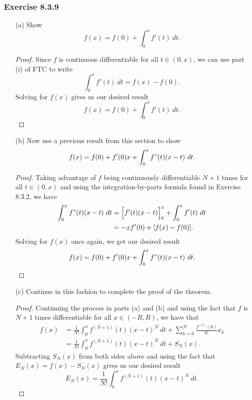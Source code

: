 \subsubsection{Exercise 8.3.9} 
\begin{enumerate}
    \item[(a)] Show 
        \[  f(x) = f(0) + \int_{ 0 }^{ x }  f'(t) \  dt. \]
        \begin{proof}
            Since \( f  \) is continuous differentiable for all  \( t \in (0,x) \), we can use part (i) of FTC to write 
        \[  \int_{ 0 }^{ x } f'(t)  \ dt =  f(x) - f(0). \] Solving for \( f(x)  \) gives us our desired result 
        \[ f(x) = f(0) + \int_{ 0 }^{ x }  f'(t) \ dt. \]
        \end{proof}
    \item[(b)] Now use a previous result from this section to show 
        \[  f(x) = f(0) + f'(0) x + \int_{ 0 }^{ x }  f"(t)(x-t) \  dt. \]
        \begin{proof}
            Taking advantage of \( f  \) being continuously differentiable \( N+1  \) times for all \(  t \in (0,x) \) and using the integration-by-parts formula found in Exercise 8.3.2, we have 
            \begin{align*}  \int_{ 0 }^{ x }  f"(t) (x -t ) \  dt &= \Big[ f'(t) (x-t) \Big]_{0}^{x} + \int_{ 0 }^{ x }  f'(t) \  dt \\
            &= -x f'(0) + [ f(x) - f(0)].  
            \end{align*}
            Solving for \( f(x)  \) once again, we get our desired result
        \[  f(x) = f(0) + f'(0) x + \int_{ 0 }^{ x }  f"(t)(x-t) \  dt. \]
        \end{proof}
    \item[(c)] Continue in this fashion to complete the proof of the theorem.
        \begin{proof} 
        Continuing the process in parts (a) and (b) and using the fact that \( f  \) is \( N+1  \) times differentiable for all \( x \in (-R ,R ) \), we have that
        \begin{align*}  f(x) &= \frac{ 1 }{ N! }  \int_{ 0 }^{ x  } f^{(N+1)}(t) (x -t )^{N} \  dt + \sum_{ k=0  }^{ N  } \frac{ f^{(k)}(0) }{ k! } x_{k } \\  
            &= \frac{ 1 }{ N! } \int_{ 0 }^{ x }  f^{(N+1)}(t) (x-t)^{N} \   dt + S_{N}(x).
        \end{align*}
        Subtracting \( S_{N}(x)  \) from both sides above and using the fact that \( E_{N}(x) = f(x) - S_{N}(x)  \) gives us our desired result 
    \[  E_{N}(x) = \frac{ 1 }{ N! } \int_{ 0 }^{ x  }  f^{(N+1) }(t) (x-t)^{N} \  dt.  \]
        \end{proof}
\end{enumerate}

